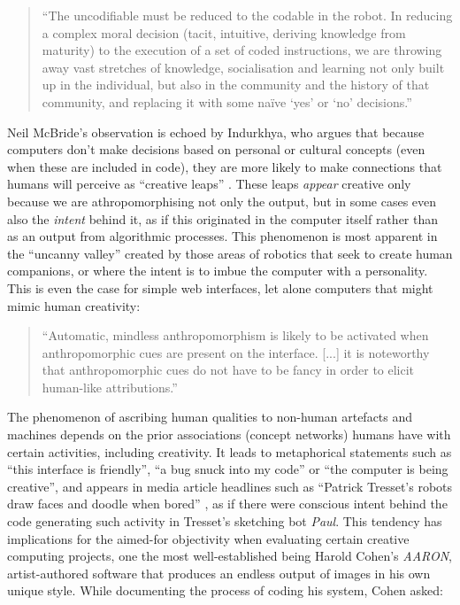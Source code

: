 \begin{leftbar}
\begin{quotation}
  ``The uncodifiable must be reduced to the codable in the robot. In reducing a complex moral decision (tacit, intuitive, deriving knowledge from maturity) to the execution of a set of coded instructions, we are throwing away vast stretches of knowledge, socialisation and learning not only built up in the individual, but also in the community and the history of that community, and replacing it with some na{\"i}ve `yes' or `no' decisions.'' \autocite{Mcbride2012}
\end{quotation}

Neil McBride's observation is echoed by Indurkhya, who argues that because computers don't make decisions based on personal or cultural concepts (even when these are included in code), they are more likely to make connections that humans will perceive as ``creative leaps'' \autocite{Indurkhya}. These leaps \textit{appear} creative only because we are athropomorphising not only the output, but in some cases even also the \textit{intent} behind it, as if this originated in the computer itself rather than as an output from algorithmic processes. This phenomenon is most apparent in the ``uncanny valley'' created by those areas of robotics that seek to create human companions, or where the intent is to imbue the computer with a personality. This is even the case for simple web interfaces, let alone computers that might mimic human creativity:

\begin{quotation}
  ``Automatic, mindless anthropomorphism is likely to be activated when anthropomorphic cues are present on the interface. [...] it is noteworthy that anthropomorphic cues do not have to be fancy in order to elicit human-like attributions.'' \autocite{Kim2012}
\end{quotation}

The phenomenon of ascribing human qualities to non-human artefacts and machines depends on the prior associations (concept networks) humans have with certain activities, including creativity. It leads to metaphorical statements such as ``this interface is friendly'', ``a bug snuck into my code'' or ``the computer is being creative'', and appears in media article headlines such as ``Patrick Tresset's robots draw faces and doodle when bored'' \autocite{Wired2011}, as if there were conscious intent behind the code generating such activity in Tresset's sketching bot \textit{Paul}. This tendency has implications for the aimed-for objectivity when evaluating certain creative computing projects, one the most well-established being Harold Cohen's \textit{AARON}, artist-authored software that produces an endless output of images in his own unique style. While documenting the process of coding his system, Cohen asked:


\end{leftbar}
